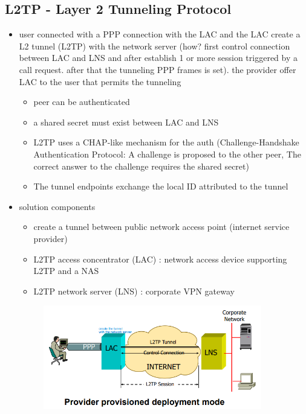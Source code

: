 \documentclass{article}
\begin{document}
\subsection{L2TP - Layer 2 Tunneling Protocol}
\begin{itemize}
    \item user connected with a PPP connection with the LAC and the LAC create a L2 tunnel (L2TP) with the network server (how? first control connection between LAC and LNS and after establish 1 or more session triggered by a call request. after that the tunneling PPP frames is set). the provider offer LAC to the user that permits the tunneling
    \begin{itemize}
        \item peer can be authenticated
        \item a shared secret must exist between LAC and LNS
        \item L2TP uses a CHAP-like mechanism for the auth (Challenge-Handshake Authentication Protocol: A challenge is proposed to the other peer, The correct answer to the challenge requires the shared secret)
        \item The tunnel endpoints exchange the local ID attributed to the tunnel
    \end{itemize}
    \item solution components
    \begin{itemize}
        \item create a tunnel between public network access point (internet service provider)
        \item L2TP access concentrator (LAC) : network access device supporting L2TP and a NAS
        \item L2TP network server (LNS) : corporate VPN gateway       
    \end{itemize}
    \begin{figure}[H]
        \centering
        \includegraphics[width=0.90\textwidth]{figure/L2TP.png}

\end{figure}
\end{itemize}
\end{document}
